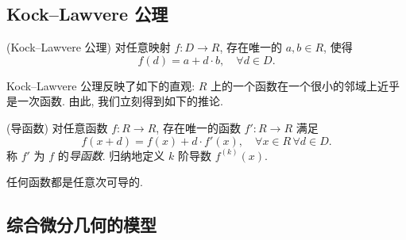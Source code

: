 \subsection{Kock--Lawvere 公理}

\begin{axiom}
	{(Kock--Lawvere 公理)}
	对任意映射 $f \colon D \to R$, 存在唯一的 $a,b\in R$,
	使得
	$$
	f(d) = a + d\cdot b,\quad\forall d\in D.
	$$
\end{axiom}

Kock--Lawvere 公理反映了如下的直观: $R$ 上的一个函数在一个很小的邻域上近乎是一次函数.
由此, 我们立刻得到如下的推论.

\begin{propdef}
	{(导函数)}
	对任意函数 $f\colon R\to R$, 存在唯一的函数 $f' \colon R \to R$ 满足
	$$
	f(x+d) = f(x) + d \cdot f'(x),\quad \forall x\in R\,\forall d\in D.
	$$
	称 $f'$ 为 $f$ 的\emph{导函数}. 归纳地定义 $k$ 阶导数 $f^{(k)}(x)$.
\end{propdef}

任何函数都是任意次可导的.

\subsection{综合微分几何的模型}

